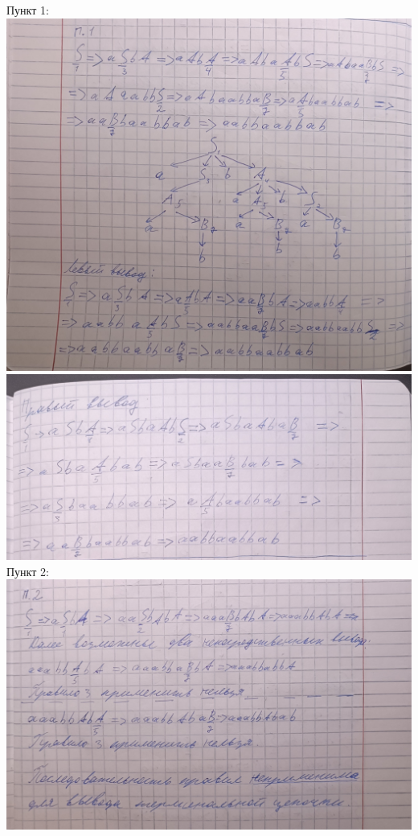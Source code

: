 \documentclass[a4paper,14pt]{extarticle}
\begin{document}
\begin{enumerate}[1.]
          Пункт 1:\\
          \includegraphics[width=140mm]{task6_1_1}\\
          \includegraphics[width=140mm]{task6_1_2}\bigbreak
          Пункт 2:\\
          \includegraphics[width=140mm]{task6_2}\bigbreak

\end{enumerate}
\end{document}
